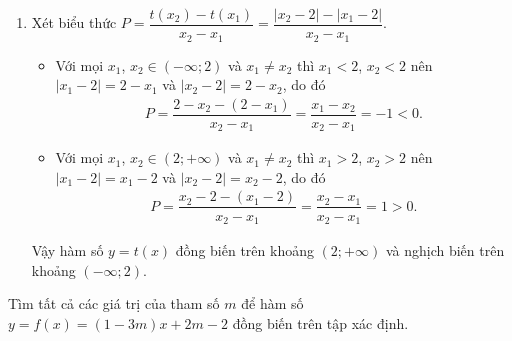 \begin{vd}
{\begin{enumerate}
			      \begin{eqnarray*}
				      P&=&\dfrac{h(x_2)-h(x_1)}{x_2-x_1}\\
				      &=&\dfrac{\sqrt{4-3x_2}-\sqrt{4-3x_1}}{x_2-x_1}=\dfrac{4-3x_2-(4-3x_1)}{(x_2-x_1)(\sqrt{4-3x_2}+\sqrt{4-3x_1})}\\
				      &=&-\dfrac{3}{\sqrt{4-3x_2}+\sqrt{4-3x_1}}<0.
			      \end{eqnarray*}
			      Vậy hàm số đã cho nghịch biến trên khoảng $\left(-\infty;\dfrac{4}{3}\right)$.
			\item Xét biểu thức $P=\dfrac{t(x_2)-t(x_1)}{x_2-x_1}=\dfrac{|x_2-2|-|x_1-2|}{x_2-x_1}$.
			      \begin{itemize}
				      \item Với mọi $x_1$, $x_2\in (-\infty;2)$ và $x_1\neq x_2$ thì $x_1<2$, $x_2<2$ nên $|x_1-2|=2-x_1$ và $|x_2-2|=2-x_2$, do đó
				            \begin{align*}
					            P=\dfrac{2-x_2-(2-x_1)}{x_2-x_1}=\dfrac{x_1-x_2}{x_2-x_1}=-1<0.
				            \end{align*}
				      \item Với mọi $x_1$, $x_2\in (2;+\infty)$ và $x_1\neq x_2$ thì $x_1>2$, $x_2>2$ nên $|x_1-2|=x_1-2$ và $|x_2-2|=x_2-2$, do đó
				            \begin{align*}
					            P=\dfrac{x_2-2-(x_1-2)}{x_2-x_1}=\dfrac{x_2-x_1}{x_2-x_1}=1>0.
				            \end{align*}
			      \end{itemize}
			      Vậy hàm số $y=t(x)$ đồng biến trên khoảng $(2;+\infty)$ và nghịch biến trên khoảng $(-\infty;2)$.
		\end{enumerate}
	}
\end{vd}

\begin{vd}%
	Tìm tất cả các giá trị của tham số $m$ để hàm số $y=f(x)=(1-3m)x+2m-2$ đồng biến trên tập xác định.
\end{vd}


